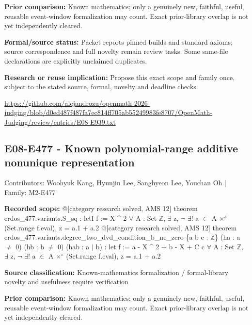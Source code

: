 \documentclass[11pt,a4paper]{article}
\begin{document}
\textbf{Prior comparison:} Known mathematics; only a genuinely new, faithful, useful, reusable event-window formalization may count. Exact prior-library overlap is not yet independently cleared.

\textbf{Formal/source status:} Packet reports pinned builds and standard axioms; source correspondence and full novelty remain review tasks. Some same-file declarations are explicitly unclaimed duplicates.

\textbf{Research or reuse implication:} Propose this exact scope and family once, subject to the stated source, formal, novelty and deadline checks.

{\small \url{https://github.com/alejandrozu/openmath-2026-judging/blob/d0ed487f487fa7ec814ff705ab55249983fe8707/OpenMath-Judging/review/entries/E08-E939.txt}\par}

\begin{samepage}
\subsection{E08-E477  -  Known polynomial-range additive nonunique representation}
{\small Contributors: Woohyuk Kang, Hyunjin Lee, Sanghyeon Lee, Youchan Oh | Family: M2-E477\par}

\textbf{Recorded scope:} @[category research solved, AMS 12] theorem erdos\_477.variants.S\_sq :
    letI f := X \textasciicircum{} 2
    \ensuremath{\forall} A : Set \ensuremath{\mathbb{Z}}, \ensuremath{\exists} z, \ensuremath{\neg} \ensuremath{\exists}! a \ensuremath{\in} A \ensuremath{\times}\ensuremath{^{s}} (Set.range f.eval), z = a.1 + a.2
@[category research solved, AMS 12] theorem erdos\_477.variants.degree\_two\_dvd\_condition\_b\_ne\_zero \{a b c : \ensuremath{\mathbb{Z}}\} (ha : a \ensuremath{\neq} 0) (hb : b \ensuremath{\neq} 0) (hab : a \ensuremath{\mid} b) :
    let f := a - X \textasciicircum{} 2 + b - X + C c
    \ensuremath{\forall} A : Set \ensuremath{\mathbb{Z}}, \ensuremath{\exists} z, \ensuremath{\neg} \ensuremath{\exists}! a \ensuremath{\in} A \ensuremath{\times}\ensuremath{^{s}} (Set.range f.eval), z = a.1 + a.2


\end{samepage}
\textbf{Source classification:} Known-mathematics formalization / formal-library novelty and usefulness require verification

\textbf{Prior comparison:} Known mathematics; only a genuinely new, faithful, useful, reusable event-window formalization may count. Exact prior-library overlap is not yet independently cleared.
\end{document}
